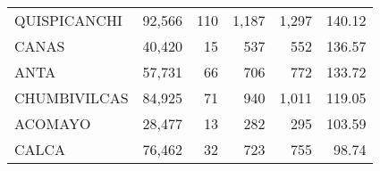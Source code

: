 \begin{tabular}{lrrrrr}
	\cellcolor[HTML]{FFFC9E}QUISPICANCHI                                               & 92,566                                                         & 110                                                      & 1,187                                                    & 1,297                                                               & 140.12                                                                       \\
	\cellcolor[HTML]{FFFC9E}CANAS                                                      & 40,420                                                         & 15                                                       & 537                                                      & 552                                                                 & 136.57                                                                       \\
	\cellcolor[HTML]{FFFC9E}ANTA                                                       & 57,731                                                         & 66                                                       & 706                                                      & 772                                                                 & 133.72                                                                       \\
	\cellcolor[HTML]{9AFF99}CHUMBIVILCAS                                               & 84,925                                                         & 71                                                       & 940                                                      & 1,011                                                               & 119.05                                                                       \\
	\cellcolor[HTML]{9AFF99}ACOMAYO                                                    & 28,477                                                         & 13                                                       & 282                                                      & 295                                                                 & 103.59                                                                       \\
	\cellcolor[HTML]{9AFF99}CALCA                                                      & 76,462                                                         & 32                                                       & 723                                                      & 755                                                                 & 98.74                                                                        \\

\end{tabular}

